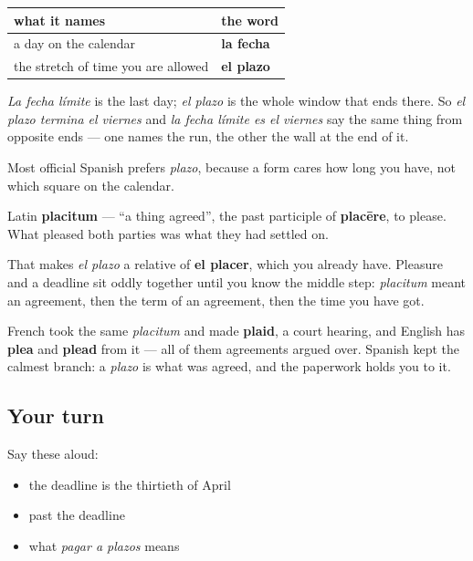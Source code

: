 \begin{grammarlens}[title={Grammar Lens: plazo is not fecha}]
\noindent
\begin{tabularx}{\linewidth}{@{}>{\raggedright\arraybackslash}X>{\raggedright\arraybackslash}X@{}}
\toprule
\textbf{what it names} & \textbf{the word} \\
\midrule
a day on the calendar & \textbf{la fecha} \\
the stretch of time you are allowed & \textbf{el plazo} \\
\bottomrule
\end{tabularx}

\emph{La fecha límite} is the last day; \emph{el plazo} is the whole window that ends there. So \emph{el plazo termina el viernes} and \emph{la fecha límite es el viernes} say the same thing from opposite ends — one names the run, the other the wall at the end of it.

Most official Spanish prefers \emph{plazo}, because a form cares how long you have, not which square on the calendar.
\end{grammarlens}

\begin{cousinweb}
Latin \textbf{placitum} — \textquotedblleft{}a thing agreed\textquotedblright{}, the past participle of \textbf{placēre}, to please. What pleased both parties was what they had settled on.

That makes \emph{el plazo} a relative of \textbf{el placer}, which you already have. Pleasure and a deadline sit oddly together until you know the middle step: \emph{placitum} meant an agreement, then the term of an agreement, then the time you have got.

French took the same \emph{placitum} and made \textbf{plaid}, a court hearing, and English has \textbf{plea} and \textbf{plead} from it — all of them agreements argued over. Spanish kept the calmest branch: a \emph{plazo} is what was agreed, and the paperwork holds you to it.
\end{cousinweb}

\subsection*{Your turn}
Say these aloud:

\begin{itemize}
\raggedright
  \item the deadline is the thirtieth of April
  \item past the deadline
  \item what \emph{pagar a plazos} means
\end{itemize}

